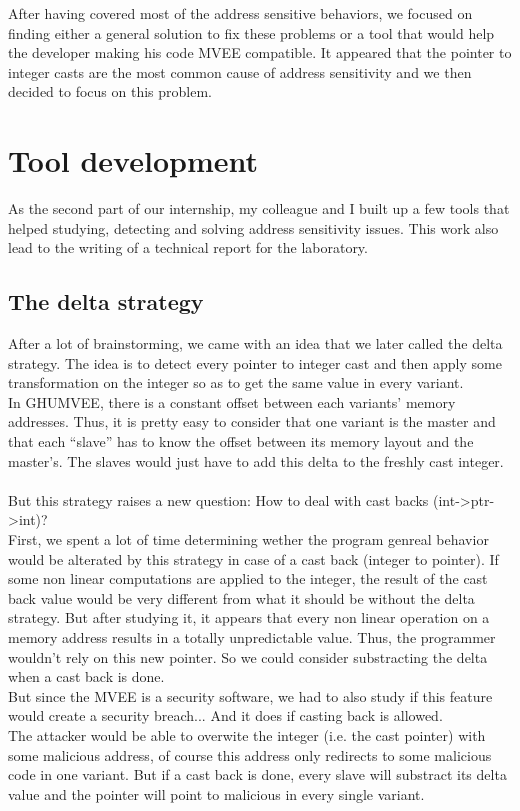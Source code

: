 \documentclass[english]{enstaPRE}
\begin{document}
After having covered most of the address sensitive behaviors, we focused on finding either a general solution to fix these 
problems or a tool that would help the developer making his code MVEE compatible.
It appeared that the pointer to integer casts are the most common cause of address sensitivity and we then decided to focus on this 
problem.

\chapter{Tool development}

As the second part of our internship, my colleague and I built up a few tools that helped studying, detecting and solving address
sensitivity issues. This work also lead to the writing of a technical report for the laboratory.

\section{The delta strategy}

After a lot of brainstorming, we came with an idea that we later called the delta strategy.
The idea is to detect every pointer to integer cast and then apply some transformation on the integer so as to get the same value
in every variant. \\
In GHUMVEE, there is a constant offset between each variants' memory addresses. Thus, it is pretty easy to consider that one
variant is the master and that each ``slave'' has to know the offset between its memory layout and the master's.
The slaves would just have to add this delta to the freshly cast integer. \\ 
 \\
But this strategy raises a new question: How to deal with cast backs (int->ptr->int)? \\ First, we spent a lot of time determining wether the program
genreal behavior would be alterated by this strategy in case of a cast back (integer to pointer). If some non linear computations
are applied to the integer, the result of the cast back value would be very different from what it should be without the delta 
strategy. But after studying it, it appears that every non linear operation on a memory address results in a totally unpredictable
value. Thus, the programmer wouldn't rely on this new pointer. So we could consider substracting the delta when a cast back is done. \\
But since the MVEE is a security software, we had to also study if this feature would create a security breach... And it does if casting
back is allowed. \\ The attacker would be able to overwite the integer (i.e. the cast pointer) with some malicious address, of course
this address only redirects to some malicious code in one variant. But if a cast back is done, every slave will substract its delta
value and the pointer will point to malicious in every single variant. \\ 
 \\
\end{document}
